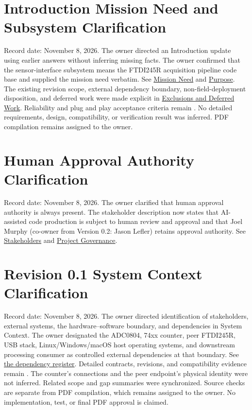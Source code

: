 \section{Introduction Mission Need and Subsystem Clarification}
\label{Section:IntroductionClarificationPromptLog}
Record date: November 8, 2026. The owner directed an Introduction update
using earlier answers without inferring missing facts. The owner confirmed
that the sensor-interface subsystem means the FTDI245R acquisition pipeline
code base and supplied the mission need verbatim. See
\hyperref[Section:ProjectMissionNeed]{Mission Need} and
\hyperref[Section:ProjectPurpose]{Purpose}. The existing revision scope,
external dependency boundary, non-field-deployment disposition, and deferred
work were made explicit in
\hyperref[Section:ProjectExclusions]{Exclusions and Deferred Work}.
Reliability and plug and play acceptance criteria remain \OwnedTBD{}. No detailed
requirements, design, compatibility, or verification result was inferred.
PDF compilation remains assigned to the owner.

\section{Human Approval Authority Clarification}
Record date: November 8, 2026. The owner clarified that human approval
authority is always present. The stakeholder description now states that
AI-assisted code production is subject to human review and approval and that
Joel Murphy (co-owner from Version 0.2: Jason Lefler) retains approval authority. See
\hyperref[Section:ContextStakeholders]{Stakeholders} and
\hyperref[Section:ProjectGovernance]{Project Governance}.

\section{Revision 0.1 System Context Clarification}
\label{Section:ContextDependencyPromptLog}
Record date: November 8, 2026. The owner directed identification of
stakeholders, external systems, the hardware--software boundary, and
dependencies in System Context. The owner designated the ADC0804, 74xx
counter, peer FTDI245R, USB stack, Linux/Windows/macOS host operating systems,
and downstream processing consumer as controlled external dependencies at
that boundary. See \hyperref[Table:ContextDependencies]{the dependency
register}. Detailed contracts, revisions, and compatibility evidence remain
\OwnedTBD{}. The counter's connections and the peer endpoint's physical identity
were not inferred. Related scope and gap summaries were synchronized.
Source checks are separate from PDF compilation, which remains assigned to
the owner. No implementation, test, or final PDF approval is claimed.

